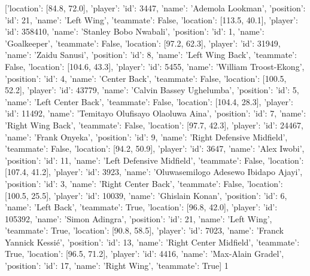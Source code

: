 [{'location': [84.8, 72.0], 'player': {'id': 3447, 'name': 'Ademola Lookman'}, 'position': {'id': 21, 'name': 'Left Wing'}, 'teammate': False}, {'location': [113.5, 40.1], 'player': {'id': 358410, 'name': 'Stanley Bobo Nwabali'}, 'position': {'id': 1, 'name': 'Goalkeeper'}, 'teammate': False}, {'location': [97.2, 62.3], 'player': {'id': 31949, 'name': 'Zaidu Sanusi'}, 'position': {'id': 8, 'name': 'Left Wing Back'}, 'teammate': False}, {'location': [104.6, 43.3], 'player': {'id': 5455, 'name': 'William Troost-Ekong'}, 'position': {'id': 4, 'name': 'Center Back'}, 'teammate': False}, {'location': [100.5, 52.2], 'player': {'id': 43779, 'name': 'Calvin Bassey Ughelumba'}, 'position': {'id': 5, 'name': 'Left Center Back'}, 'teammate': False}, {'location': [104.4, 28.3], 'player': {'id': 11492, 'name': 'Temitayo Olufisayo Olaoluwa Aina'}, 'position': {'id': 7, 'name': 'Right Wing Back'}, 'teammate': False}, {'location': [97.7, 42.3], 'player': {'id': 24467, 'name': 'Frank Onyeka'}, 'position': {'id': 9, 'name': 'Right Defensive Midfield'}, 'teammate': False}, {'location': [94.2, 50.9], 'player': {'id': 3647, 'name': 'Alex Iwobi'}, 'position': {'id': 11, 'name': 'Left Defensive Midfield'}, 'teammate': False}, {'location': [107.4, 41.2], 'player': {'id': 3923, 'name': 'Oluwasemilogo Adesewo Ibidapo Ajayi'}, 'position': {'id': 3, 'name': 'Right Center Back'}, 'teammate': False}, {'location': [100.5, 25.5], 'player': {'id': 10039, 'name': 'Ghislain Konan'}, 'position': {'id': 6, 'name': 'Left Back'}, 'teammate': True}, {'location': [96.8, 42.0], 'player': {'id': 105392, 'name': 'Simon Adingra'}, 'position': {'id': 21, 'name': 'Left Wing'}, 'teammate': True}, {'location': [90.8, 58.5], 'player': {'id': 7023, 'name': 'Franck Yannick Kessié'}, 'position': {'id': 13, 'name': 'Right Center Midfield'}, 'teammate': True}, {'location': [96.5, 71.2], 'player': {'id': 4416, 'name': 'Max-Alain Gradel'}, 'position': {'id': 17, 'name': 'Right Wing'}, 'teammate': True}]                                                                                                                                                                                                                                                                                                                                                                                                                                                                                                                                                                                                                                                                                                                                                                                                                                                                                                                                                                       1
